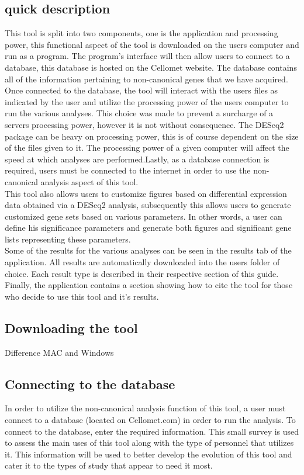 \documentclass[11pt]{article}
\begin{document}
\subsection{quick description}
This tool is split into two components, one is the application and processing power, this functional aspect of the tool is downloaded on the users computer and run as a program. The program's interface will then allow users to connect to a database, this database is hosted on the Cellomet website. The database contains all of the information pertaining to non-canonical genes that we have acquired. Once connected to the database, the tool will interact with the users files as indicated by the user and utilize the processing power of the users computer to run the various analyses. This choice was made to prevent a surcharge of a servers processing power, however it is not without consequence.
The DESeq2 package can be heavy on processing power, this is of course dependent on the size of the files given to it. The processing power of a given computer will affect the speed at which analyses are performed.Lastly, as a database connection is required, users must be connected to the internet in order to use the non-canonical analysis aspect of this tool.
\\
This tool also allows users to customize figures based on differential expression data obtained via a DESeq2 analysis, subsequently this allows users to generate customized gene sets based on various parameters. In other words, a user can define his significance parameters and generate both figures and significant gene lists representing these parameters.
\\
Some of the results for the various analyses can be seen in the results tab of the application. All results are automatically downloaded into the users folder of choice. Each result type is described in their respective section of this guide.
\\
Finally, the application contains a section showing how to cite the tool for those who decide to use this tool and it's results.


\subsection{Downloading the tool \label{download_tool}}
Difference MAC and Windows
\subsection{Connecting to the database \label{connect_DB}}
In order to utilize the non-canonical analysis function of this tool, a user must connect to a database (located on Cellomet.com) in order to run the analysis.
To connect to the database, enter the required information. This small survey is used to assess the main uses of this tool along with the type of personnel that utilizes it. This information will be used to better develop the evolution of this tool and cater it to the types of study that appear to need it most.
\end{document}
